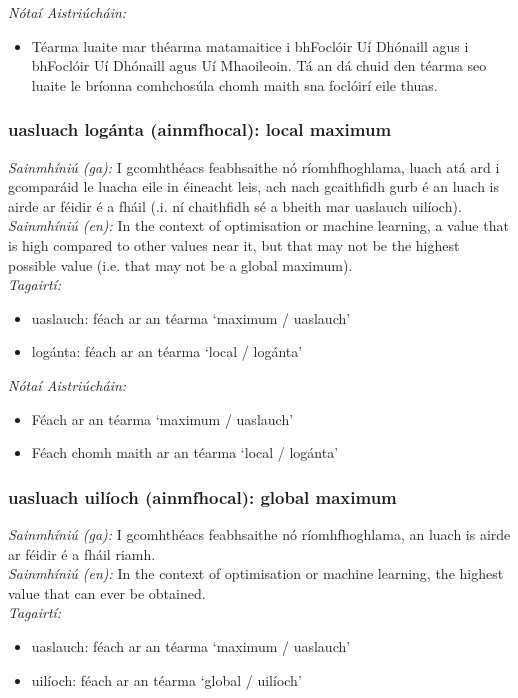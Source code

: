 \documentclass{article}
\begin{document}
 \noindent \textit{Nótaí Aistriúcháin:}
\begin{itemize}
	\item Téarma luaite mar théarma matamaitice i bhFoclóir Uí Dhónaill agus i bhFoclóir Uí Dhónaill agus Uí Mhaoileoin. Tá an dá chuid den téarma seo luaite le bríonna comhchosúla chomh maith sna foclóirí eile thuas.
\end{itemize}


\subsubsection*{uasluach logánta (ainmfhocal): local maximum}
 \noindent \textit{Sainmhíniú (ga):} I gcomhthéacs feabhsaithe nó ríomhfhoghlama, luach atá ard i gcomparáid le luacha eile in éineacht leis, ach nach gcaithfidh gurb é an luach is airde ar féidir é a fháil (.i. ní chaithfidh sé a bheith mar uaslauch uilíoch).
\\
 \noindent \textit{Sainmhíniú (en):} In the context of optimisation or machine learning, a value that is high compared to other values near it, but that may not be the highest possible value (i.e. that may not be a global maximum).
\\
 \noindent \textit{Tagairtí:}
\begin{itemize}
	\item uaslauch: féach ar an téarma `maximum / uaslauch'
	\item logánta: féach ar an téarma `local / logánta'
\end{itemize}

 \noindent \textit{Nótaí Aistriúcháin:}
\begin{itemize}
	\item Féach ar an téarma `maximum / uaslauch'
	\item Féach chomh maith ar an téarma `local / logánta'
\end{itemize}


\subsubsection*{uasluach uilíoch (ainmfhocal): global maximum}
 \noindent \textit{Sainmhíniú (ga):} I gcomhthéacs feabhsaithe nó ríomhfhoghlama, an luach is airde ar féidir é a fháil riamh.
\\
 \noindent \textit{Sainmhíniú (en):} In the context of optimisation or machine learning, the highest value that can ever be obtained.
\\
 \noindent \textit{Tagairtí:}
\begin{itemize}
	\item uaslauch: féach ar an téarma `maximum / uaslauch'
	\item uilíoch: féach ar an téarma `global / uilíoch'
\end{itemize}
\end{document}
